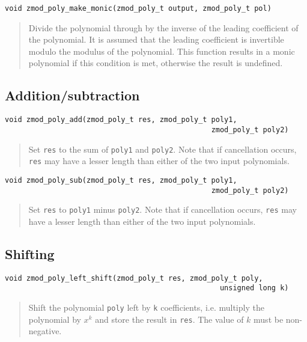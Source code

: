 \documentclass[a4paper,10pt]{article}
\newcommand{\code}{\lstinline}
\begin{document}
\begin{lstlisting}
void zmod_poly_make_monic(zmod_poly_t output, zmod_poly_t pol)
\end{lstlisting}
\begin{quote}
Divide the polynomial through by the inverse of the leading coefficient of the polynomial. It is assumed that the leading coefficient is invertible modulo the modulus of the polynomial. This function results in a monic polynomial if this condition is met, otherwise the result is undefined.
\end{quote}

\subsection{Addition/subtraction}
\begin{lstlisting}
void zmod_poly_add(zmod_poly_t res, zmod_poly_t poly1, 
                                                zmod_poly_t poly2)
\end{lstlisting}
\begin{quote}
Set \code{res} to the sum of \code{poly1} and \code{poly2}. Note that if cancellation occurs, \code{res} may have a lesser length than either of the two input polynomials.
\end{quote}

\begin{lstlisting}
void zmod_poly_sub(zmod_poly_t res, zmod_poly_t poly1, 
                                                zmod_poly_t poly2)
\end{lstlisting}
\begin{quote}
Set \code{res} to \code{poly1} minus \code{poly2}. Note that if cancellation occurs, \code{res} may have a lesser length than either of the two input polynomials.
\end{quote}

\subsection{Shifting}
\begin{lstlisting}
void zmod_poly_left_shift(zmod_poly_t res, zmod_poly_t poly, 
                                                  unsigned long k)
\end{lstlisting}
\begin{quote}
Shift the polynomial \code{poly} left by \code{k} coefficients, i.e. multiply the polynomial by $x^k$ and store the result in \code{res}. The value of $k$ must be non-negative.
\end{quote}
\end{document}
